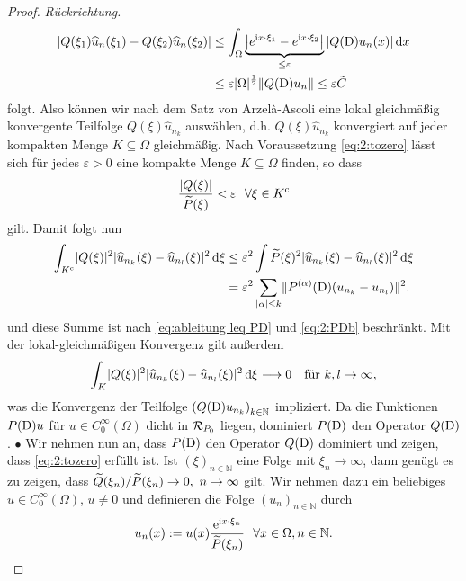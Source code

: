 \begin{proof} {\it Rückrichtung.}
\begin{align}
| Q(\xi_1)\widehat{u}_n(\xi_1) - Q(\xi_2)\widehat{u}_n(\xi_2)| & \leq \int_{\Omega}  \underbrace{\left| e^{\mathrm i x \cdot \xi_1} - e^{\mathrm i x \cdot \xi_2} \right| }_{\leq \varepsilon} | Q(\mathrm D) u_n(x)| \,\mathrm d x 
\\ & \leq \varepsilon |\Omega|^{\frac{1}{2}} \Vert Q(\mathrm D)u_n \Vert \leq \varepsilon \tilde{C}
\end{align}
folgt. Also können wir nach dem Satz von Arzel\`a-Ascoli eine lokal gleichmäßig konvergente Teilfolge $Q(\xi)\widehat{u}_{n_k}$ auswählen, d.h. $Q(\xi)\widehat{u}_{n_k}$ konvergiert auf jeder kompakten Menge $K \subseteq \Omega$ gleichmäßig.
Nach Voraussetzung \eqref{eq:2:tozero} lässt sich für jedes $\varepsilon > 0$ eine kompakte Menge $K \subseteq \Omega$ finden, so dass 
\begin{equation}
\frac{\lvert Q(\xi)\rvert}{\widetilde{P}(\xi)} <\varepsilon \ \ \forall \xi \in K^{\mathrm{c}}
\end{equation}
gilt. Damit folgt nun
\begin{align}
\int_{K^{\mathrm c}}\lvert Q(\xi)\rvert^2\lvert\widehat{u}_{n_k}(\xi)-\widehat{u}_{n_l}(\xi)\rvert^2\,\mathrm d \xi
&\leq\varepsilon^2\int\widetilde{P}(\xi)^2\lvert\widehat{u}_{n_k}(\xi)-\widehat{u}_{n_l}(\xi)\rvert^2\,\mathrm d \xi\\
&=\varepsilon^2\sum_{|\alpha| \leq k}\lVert P^{(\alpha)}(\mathrm D)(u_{n_k}-u_{n_l})\rVert^2.\label{eq:2:Kcsum}
\end{align}
und diese Summe ist nach \eqref{eq:ableitung leq PD}
und \eqref{eq:2:PDb} beschränkt.
Mit der lokal-gleichmäßigen Konvergenz gilt außerdem
\begin{equation}
\int_K\lvert Q(\xi)\rvert^2\lvert\widehat{u}_{n_k}(\xi)-\widehat{u}_{n_l}(\xi)\rvert^2\,\mathrm d \xi\longrightarrow0
\quad\text{für}~ k,l \rightarrow \infty,
\end{equation}
was die Konvergenz der Teilfolge $\left(Q(\mathrm D)u_{n_k} \right)_{k \in \mathbb{N}}$ impliziert. Da die Funktionen $P(\mathrm D)u$ für $u\in C^\infty_0(\Omega)$ dicht in $\mathcal R_{P_0}$ liegen, dominiert $P(\mathrm D)$ den Operator $Q(\mathrm D)$.
$\bullet$
Wir nehmen nun an, dass $P(\mathrm D)$ den Operator $Q(\mathrm D)$ dominiert und zeigen, dass \eqref{eq:2:tozero} erfüllt ist.
 Ist $(\xi)_{n \in \mathbb{N}}$ eine Folge mit $\xi_n \rightarrow \infty$, dann genügt es zu zeigen, dass $\widetilde{Q}(\xi_{n})/\widetilde{P}(\xi_{n})\to0, \ n \rightarrow \infty$ gilt.
Wir nehmen dazu ein beliebiges $u\in C^\infty_0(\Omega)$, $u\neq0$ und definieren die Folge $(u_n)_{n \in \mathbb{N}}$ durch
\begin{equation}
u_n(x):=u(x)\frac{\e^{\i x \cdot \xi_n}}{\til{P}(\xi_n)}\ \ \forall x \in \Omega, n \in \mathbb{N}.

\end{equation}
\end{proof}
